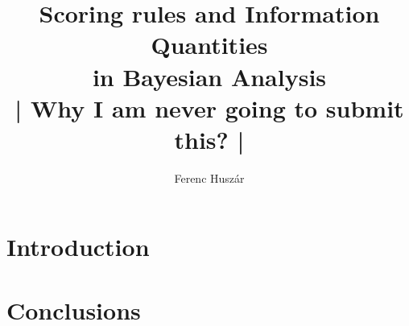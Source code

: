 \documentclass[11pt]{book}
\title{Scoring rules and Information Quantities\\in Bayesian Analysis \\ | Why I am never going to submit this? |}
\author{Ferenc Husz\'{a}r}
\makeatletter
\newcommand{\ChapterOutsidePart}{%
   \def\toclevel@chapter{-1}\def\toclevel@section{0}\def\toclevel@subsection{1}}
\newcommand{\ChapterInsidePart}{%
   \def\toclevel@chapter{0}\def\toclevel@section{1}\def\toclevel@subsection{2}}
\makeatother
\begin{document}
\maketitle

\ChapterOutsidePart 
{}
\tableofcontents

\chapter{Introduction}


\ChapterInsidePart




\ChapterOutsidePart
\chapter{Conclusions}

\lipsum[1]



\end{document}
